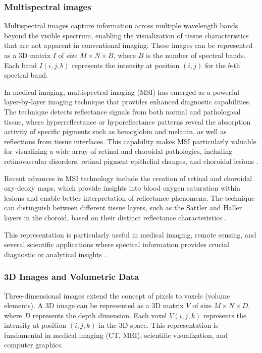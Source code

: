 \subsubsection{Multispectral images}
Multispectral images capture information across multiple wavelength
bands beyond the visible spectrum, enabling the visualization of
tissue characteristics that are not apparent in conventional imaging.
These images can be represented as a 3D matrix $I$ of size $M \times
N \times B$, where $B$ is the number of spectral bands. Each band
$I(i,j,b)$ represents the intensity at position $(i,j)$ for the
$b$-th spectral band.

In medical imaging, multispectral imaging (MSI) has emerged as a
powerful layer-by-layer imaging technique that provides enhanced
diagnostic capabilities. The technique detects reflectance signals
from both normal and pathological tissue, where hyperreflectance or
hyporeflectance patterns reveal the absorption activity of specific
pigments such as hemoglobin and melanin, as well as reflections from
tissue interfaces. This capability makes MSI particularly valuable
for visualizing a wide array of retinal and choroidal pathologies,
including retinovascular disorders, retinal pigment epithelial
changes, and choroidal lesions \cite{MaEtAl2023}.

Recent advances in MSI technology include the creation of retinal
and choroidal oxy-deoxy maps, which provide insights into blood
oxygen saturation within lesions and enable better interpretation of
reflectance phenomena. The technique can distinguish between
different tissue layers, such as the Sattler and Haller layers in
the choroid, based on their distinct reflectance characteristics
\cite{MaEtAl2023}.

This representation is particularly useful in medical imaging, remote
sensing, and several scientific applications where spectral
information provides crucial diagnostic or analytical insights
\cite{MaEtAl2023}.

\subsubsection{3D Images and Volumetric Data}
Three-dimensional images extend the concept of pixels to voxels
(volume elements). A 3D image can be represented as a 3D matrix $V$
of size $M \times N \times D$, where $D$ represents the depth
dimension. Each voxel $V(i,j,k)$ represents the intensity at position
$(i,j,k)$ in the 3D space. This representation is fundamental in
medical imaging (CT, MRI), scientific visualization, and computer
graphics.

